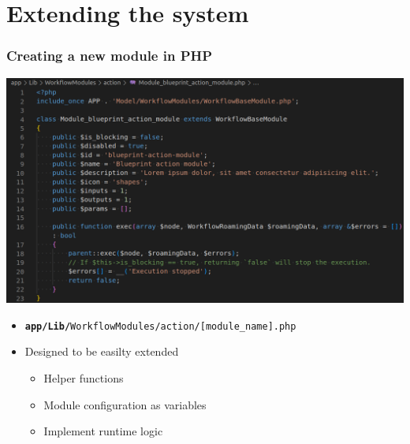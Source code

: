 \section{Extending the system}
\begin{frame}
    \frametitle{Creating a new module in PHP}
    \begin{center}
        \includegraphics[width=0.65\linewidth]{pictures/custom-1.png}
    \end{center}

    \begin{itemize}
        \item \texttt{\small \textbf{app/Lib/}WorkflowModules/action/[module\_name].php}
        \item Designed to be easilty extended
        \begin{itemize}
            \item Helper functions
            \item Module configuration as variables
            \item Implement runtime logic
        \end{itemize}
    \end{itemize}
\end{frame}

